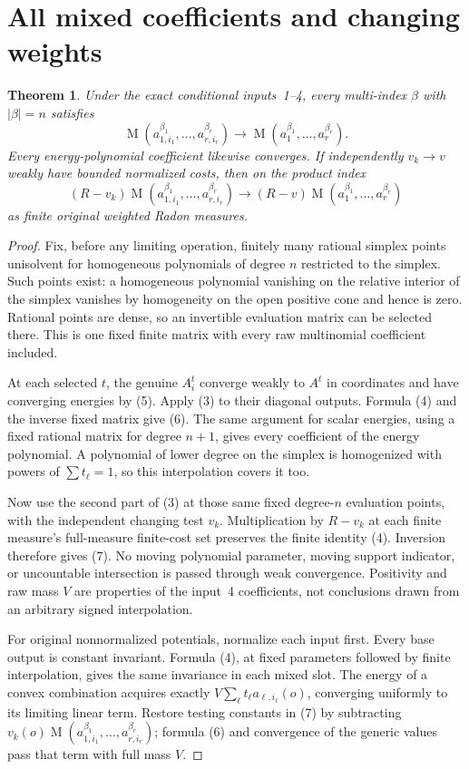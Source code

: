 \documentclass[11pt]{article}
\newtheorem{theorem}{Theorem}
\newcommand{\MA}{\operatorname{M}}
\begin{document}
\section{All mixed coefficients and changing weights}
\begin{theorem}
Under the exact conditional inputs~1--4, every multi-index
$\beta$ with $|\beta|=n$ satisfies
\[
 \MA(a_{1,i_1}^{\beta_1},\ldots,a_{r,i_r}^{\beta_r})
       \longrightarrow
 \MA(a_1^{\beta_1},\ldots,a_r^{\beta_r}).                \tag{6}
\]
Every energy-polynomial coefficient likewise converges.
If independently $v_k\to v$ weakly have bounded normalized
costs, then on the product index
\[
 (R-v_k)\MA(a_{1,i_1}^{\beta_1},\ldots,a_{r,i_r}^{\beta_r})
       \longrightarrow
 (R-v)\MA(a_1^{\beta_1},\ldots,a_r^{\beta_r})             \tag{7}
\]
as finite original weighted Radon measures.
\end{theorem}
\begin{proof}
Fix, before any limiting operation, finitely many
rational simplex points unisolvent for homogeneous
polynomials of degree $n$ restricted to the simplex.
Such points exist: a homogeneous polynomial vanishing
on the relative interior of the simplex vanishes by
homogeneity on the open positive cone and hence is zero.
Rational points are dense, so an invertible evaluation
matrix can be selected there. This is one fixed finite
matrix with every raw multinomial coefficient included.

At each selected $t$, the genuine $A_i^t$ converge
weakly to $A^t$ in coordinates and have converging
energies by (5). Apply (3) to their diagonal outputs.
Formula (4) and the inverse fixed matrix give (6).
The same argument for scalar energies, using a fixed
rational matrix for degree $n+1$, gives every coefficient
of the energy polynomial. A polynomial of lower degree
on the simplex is homogenized with powers of
$\sum t_\ell=1$, so this interpolation covers it too.

Now use the second part of (3) at those same fixed
degree-$n$ evaluation points, with the independent
changing test $v_k$. Multiplication by $R-v_k$ at each
finite measure's full-measure finite-cost set preserves
the finite identity (4). Inversion therefore gives (7).
No moving polynomial parameter, moving support indicator,
or uncountable intersection is passed through weak
convergence. Positivity and raw mass $V$ are properties
of the input~4 coefficients, not conclusions drawn from
an arbitrary signed interpolation.

For original nonnormalized potentials, normalize each
input first. Every base output is constant invariant.
Formula (4), at fixed parameters followed by finite
interpolation, gives the same invariance in each mixed slot.
The energy of a convex combination acquires exactly
$V\sum_\ell t_\ell a_{\ell,i_\ell}(o)$, converging
uniformly to its limiting linear term. Restore testing
constants in (7) by subtracting
$v_k(o)\MA(a_{1,i_1}^{\beta_1},\ldots,a_{r,i_r}^{\beta_r})$;
formula (6) and convergence of the generic values pass
that term with full mass $V$.
\end{proof}
\end{document}
